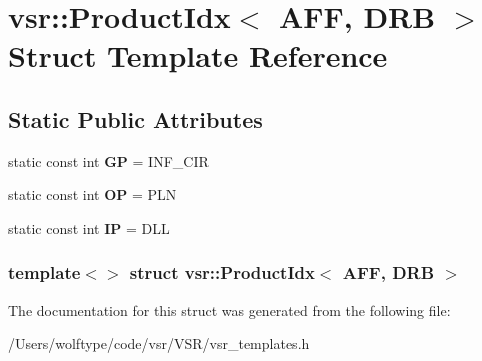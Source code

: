 \hypertarget{structvsr_1_1_product_idx_3_01_a_f_f_00_01_d_r_b_01_4}{\section{vsr\-:\-:Product\-Idx$<$ A\-F\-F, D\-R\-B $>$ Struct Template Reference}
\label{structvsr_1_1_product_idx_3_01_a_f_f_00_01_d_r_b_01_4}
}
\subsection*{Static Public Attributes}
\begin{DoxyCompactItemize}
\item 
\hypertarget{structvsr_1_1_product_idx_3_01_a_f_f_00_01_d_r_b_01_4_a784670326b86c8c31ef9d9f9ec21985a}{static const int {\bfseries G\-P} = I\-N\-F\-\_\-\-C\-I\-R}\label{structvsr_1_1_product_idx_3_01_a_f_f_00_01_d_r_b_01_4_a784670326b86c8c31ef9d9f9ec21985a}

\item 
\hypertarget{structvsr_1_1_product_idx_3_01_a_f_f_00_01_d_r_b_01_4_ae247a026db3c7103d821c2563a42b0fb}{static const int {\bfseries O\-P} = P\-L\-N}\label{structvsr_1_1_product_idx_3_01_a_f_f_00_01_d_r_b_01_4_ae247a026db3c7103d821c2563a42b0fb}

\item 
\hypertarget{structvsr_1_1_product_idx_3_01_a_f_f_00_01_d_r_b_01_4_a0acc6ead3d2b0edfd9464751cd962925}{static const int {\bfseries I\-P} = D\-L\-L}\label{structvsr_1_1_product_idx_3_01_a_f_f_00_01_d_r_b_01_4_a0acc6ead3d2b0edfd9464751cd962925}

\end{DoxyCompactItemize}
\subsubsection*{template$<$$>$ struct vsr\-::\-Product\-Idx$<$ A\-F\-F, D\-R\-B $>$}



The documentation for this struct was generated from the following file\-:\begin{DoxyCompactItemize}
\item 
/\-Users/wolftype/code/vsr/\-V\-S\-R/vsr\-\_\-templates.\-h\end{DoxyCompactItemize}
